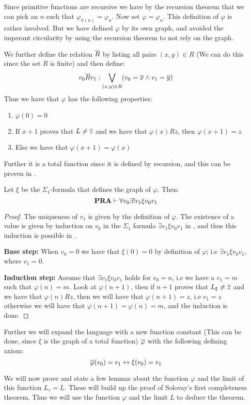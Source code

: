 \documentclass[../main.tex]{subfiles}
\begin{document}
Since primitive functions are recursive we have by the recursion theorem that
we can pick an $n$ such that $\varphi_{\vartheta(n)}=\varphi_n$. Now set
$\varphi=\varphi_n$. This definition of $\varphi$ is rather involved. But we
have defined $\varphi$ by its own graph, and avoided the imperant circularity
by using the recursion theorem to not rely on the graph.

We further define the relation $\overline R$ by listing all pairs $(x,y)\in R$ (We
can do this since the set $R$ is finite) and
then define:
\[v_0 \overline Rv_1: \bigvee_{(x,y)\in R}(v_0=\overline x\wedge v_1=\overline y) \]
Thus we have that $\varphi$ has the following properties:
\begin{enumerate}
	\item $\varphi(0)=0$
	\item If $x+1$ proves that $L\not =\overline z$ and we have that $\varphi(x)Rz$,
		then $\varphi(x+1)=z$
	\item Else we have that $\varphi(x+1)=\varphi(x)$
\end{enumerate}
Further it is a total function
since it is defined by recursion, and this can be proven in \PRA.
\begin{prop}
	Let $\xi$ be the $\Sigma_1$-formula that defines the graph of
	$\varphi$. Then:
	\[\text{\textbf{PRA}}\vdash\forall v_0\exists !v_1\xi v_0v_1\]
\end{prop}
\begin{proof}
	The uniqueness of $v_1$ is given by the definition of $\varphi$. The
	existence of a value is given by induction on $v_0$ in the $\Sigma_1$ formula $\exists
	v_1\xi v_0v_1$ in \PRA, and thus this induction is possible in \PRA. 

	\textbf{Base step:} When $v_0=0$ we have that $\xi(0)=0$ by
	definition of $\varphi$; i.e $\exists v_1\xi v_0v_1$, where $v_1=0$.

	\textbf{Induction step:} Assume that $\exists v_1\xi v_0v_1$ holds for
	$v_0=n$, i.e we have a $v_1=m$ such that $\varphi(n)=m$. Look at
	$\varphi(n+1)$, then if $n+1$ proves that $L_\xi\not =\overline z$ and we
	have that $\varphi(n)Rz$, then we will have that $\varphi(n+1)=z$, i.e
	$v_1=z$ otherwise we will have that $\varphi(n+1)=\varphi(n)=m$, and
	the induction is done.
\end{proof}
Further we will expand the language with a new function constant (This can be
done, since $\xi$ is the graph of a total function) $\overline \varphi$ with the following
defining axiom:
$$\overline \varphi(v_0)=v_1\leftrightarrow\xi (v_0)=v_1$$

We will now prove and state a few lemmas about the function $\varphi$ and the
limit of this function $L_\tau=L$. These will build up the proof of Solovay's
first completeness theorem. Thus we will use the function $\varphi$ and the
limit $L$ to deduce the theorem.
\end{document}

